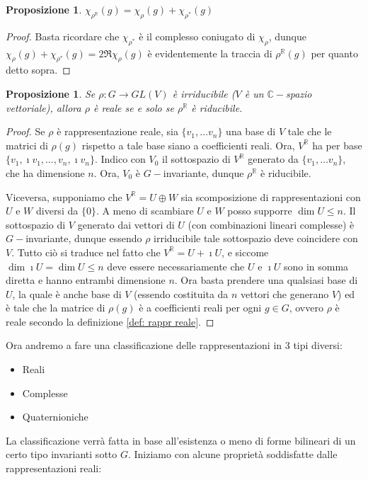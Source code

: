 \documentclass[11pt]{article}
\theoremstyle{plain}
\newtheorem{prop}[thm]{Proposizione}
\theoremstyle{definition}
\theoremstyle{remark}
\newcommand{\C}{\mathbb{C}}
\newcommand{\R}{\mathbb{R}}
\begin{document}
\begin{prop}
	$\chi_{\rho^\R}(g) = \chi_\rho(g) + \chi_{\rho^*}(g)$
\end{prop}
\begin{proof}
	Basta ricordare che $\chi_{\rho^*}$ è il complesso coniugato di $\chi_\rho$, dunque
	$\chi_\rho(g) + \chi_{\rho^*}(g) = 2\Re \chi_\rho(g)$ è evidentemente la traccia di $\rho^\R(g)$ per
	quanto detto sopra.
\end{proof}


\begin{prop}
	Se $\rho:G\to GL(V)$ è irriducibile ($V$ è un $\C-$spazio vettoriale), allora $\rho$ è reale se e solo se $\rho^\R$ è riducibile.
\end{prop}
\begin{proof}
	Se $\rho$ è rappresentazione reale, sia $\{v_1,\dots v_n\}$ una
	base di $V$ tale che le matrici di $\rho(g)$ rispetto a tale base siano a coefficienti reali.
	Ora, $V^\R$ ha per base $\{v_1, \imath v_1,\dots, v_n, \imath v_n\}$.
	Indico con $V_0$ il sottospazio di $V^\R$ generato da $\{v_1,\dots v_n\}$, che ha dimensione $n$.
	Ora, $V_0$ è $G-$invariante, dunque $\rho^\R$ è riducibile.

	Viceversa, supponiamo che $V^\R = U \oplus W$ sia scomposizione di rappresentazioni
	con $U$ e $W$ diversi da $\{0\}$. A meno di scambiare $U$ e $W$ posso supporre $\dim U \le n$.
	Il sottospazio di $V$ generato dai vettori di $U$ (con combinazioni lineari complesse) è $G-$invariante,
	dunque essendo $\rho$ irriducibile tale sottospazio deve coincidere con $V$.
	Tutto ciò si traduce nel fatto che $V^\R = U + \imath U$, e siccome $\dim\imath U = \dim U \le n$
	deve essere necessariamente che $U$ e $\imath U$ sono in somma diretta e hanno
	entrambi dimensione $n$. Ora basta prendere una qualsiasi base di $U$,
	la quale è anche base di $V$ (essendo costituita da $n$ vettori che generano $V$) ed è tale che la matrice di $\rho(g)$ è
	a coefficienti reali per ogni $g\in G$, ovvero $\rho$ è reale secondo la definizione \ref{def: rappr reale}.
\end{proof}

Ora andremo a fare una classificazione delle rappresentazioni in 3 tipi diversi:
\begin{itemize}
\item Reali
\item Complesse
\item Quaternioniche
\end{itemize}
La classificazione verrà fatta in base all'esistenza o meno di forme bilineari di un certo tipo invarianti sotto $G$.
Iniziamo con alcune proprietà soddisfatte dalle rappresentazioni reali:
\end{document}
